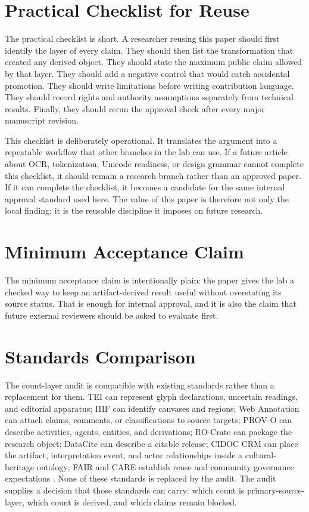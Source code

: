 \documentclass[sigconf,nonacm]{acmart}
\begin{document}
\section{Practical Checklist for Reuse}
The practical checklist is short. A researcher reusing this paper should first
identify the layer of every claim. They should then list the transformation that
created any derived object. They should state the maximum public claim allowed
by that layer. They should add a negative control that would catch accidental
promotion. They should write limitations before writing contribution language.
They should record rights and authority assumptions separately from technical
results. Finally, they should rerun the approval check after every major
manuscript revision.

This checklist is deliberately operational. It translates the argument into a
repeatable workflow that other branches in the lab can use. If a future article
about OCR, tokenization, Unicode readiness, or design grammar cannot complete
this checklist, it should remain a research branch rather than an approved
paper. If it can complete the checklist, it becomes a candidate for the same
internal approval standard used here. The value of this paper is therefore not
only the local finding; it is the reusable discipline it imposes on future
research.

\section{Minimum Acceptance Claim}
The minimum acceptance claim is intentionally plain: the paper gives the lab a
checked way to keep an artifact-derived result useful without overstating its
source status. That is enough for internal approval, and it is also the claim
that future external reviewers should be asked to evaluate first.



\section{Standards Comparison}
The count-layer audit is compatible with existing standards rather than a
replacement for them. TEI can represent glyph declarations, uncertain readings,
and editorial apparatus; IIIF can identify canvases and regions; Web Annotation
can attach claims, comments, or classifications to source targets; PROV-O can
describe activities, agents, entities, and derivations; RO-Crate can package the
research object; DataCite can describe a citable release; CIDOC CRM can place
the artifact, interpretation event, and actor relationships inside a
cultural-heritage ontology; FAIR and CARE establish reuse and community
governance expectations \cite{azuonye1992,omniglotNwagu,unicodeAfricanScripts2023,scriptSourceNwagu,sirisNwaguProposal,teiP5Glyphs,iiifPresentation3,w3cAnnotationModel,w3cAnnotationVocab,w3cProvO,rocrate12,cidocCrm,datacite45,wilkinson2016fair,carroll2020care,wadden2020scifact,gao2023alce,karpathyAutoresearch,acmSubmissions,arxivSubmitTex}. None of these standards is
replaced by the audit. The audit supplies a decision that those standards can
carry: which count is primary-source-layer, which count is derived, and which
claims remain blocked.
\end{document}
